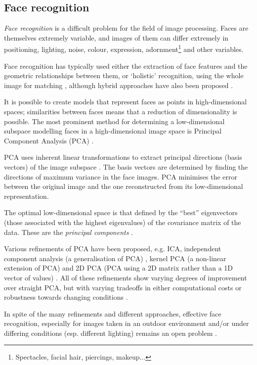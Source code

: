 \subsection{Face recognition}
\label{sec:face-rec-prior}

\emph{Face recognition} is a difficult problem for the field of image
processing. Faces are themselves extremely variable, and images of them can
differ extremely in positioning, lighting, noise, colour, expression,
adornment\footnote{Spectacles, facial hair, piercings, makeup...} and other
variables.

Face recognition has typically used either the extraction of face features and
the geometric relationships between them, or `holistic' recognition, using the
whole image for matching \cite{eigenfaces}, although hybrid approaches have also
been proposed \cite{zhao03:_face}.

It is possible to create models that represent faces as points in
high-dimensional spaces; similarities between faces means that a reduction of
dimensionality is possible. The most prominent method for determining a
low-dimensional subspace modelling faces in a high-dimensional image space is
Principal Component Analysis (PCA) \cite{eigenfaces}.

PCA uses inherent linear transformations to extract principal directions (basis
vectors) of the image subspace \cite{pca}. The basis vectors are determined by
finding the directions of maximum variance in the face images. PCA minimises the
error between the original image and the one reconstructed from its
low-dimensional representation.

The optimal low-dimensional space is that defined by the ``best'' eigenvectors
(those associated with the highest eigenvalues) of the covariance matrix of the
data. These are the \emph{principal components} \cite{pca}.

Various refinements of PCA have been proposed, e.g. ICA, independent component
analysis (a generalisation of PCA) \cite{bartlett02:_face}, kernel PCA (a
non-linear extension of PCA) \cite{kim02:_face} and 2D PCA (PCA using a 2D
matrix rather than a 1D vector of values) \cite{yang04:_two_pca}. All of these
refinements show varying degrees of improvement over straight PCA, but with
varying tradeoffs in either computational costs or robustness towards changing
conditions \cite{yang04:_two_pca}.

In spite of the many refinements and different approaches, effective face
recognition, especially for images taken in an outdoor environment and/or under
differing conditions (esp. different lighting) remains an open problem
\cite{zhao03:_face}.
